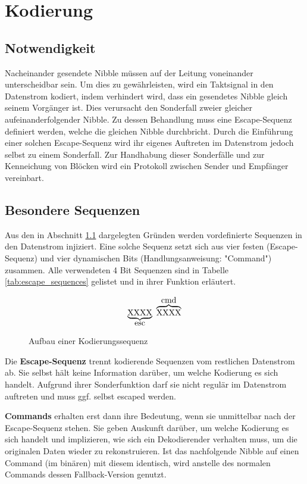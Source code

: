 \chapter{Kodierung}
\section{Notwendigkeit}
\label{sec:notwendigkeit}
Nacheinander gesendete Nibble müssen auf der Leitung voneinander unterscheidbar sein. Um dies zu gewährleisten, wird ein Taktsignal in den Datenstrom kodiert, indem verhindert wird, dass ein gesendetes Nibble gleich seinem Vorgänger ist. Dies verursacht den Sonderfall zweier gleicher aufeinanderfolgender Nibble. Zu dessen Behandlung muss eine Escape-Sequenz definiert werden, welche die gleichen Nibble durchbricht. Durch die Einführung einer solchen Escape-Sequenz wird ihr eigenes Auftreten im Datenstrom jedoch selbst zu einem Sonderfall. Zur Handhabung dieser Sonderfälle und zur Kenneichung von Blöcken wird ein Protokoll zwischen Sender und Empfänger vereinbart.

\section{Besondere Sequenzen}
Aus den in Abschnitt \ref{sec:notwendigkeit} dargelegten Gründen werden vordefinierte Sequenzen in den Datenstrom injiziert. Eine solche Sequenz setzt sich aus vier festen (Escape-Sequenz) und vier dynamischen Bits (Handlungsanweisung: "Command") zusammen. Alle verwendeten 4 Bit Sequenzen sind in Tabelle \ref{tab:escape_sequences} gelistet und in ihrer Funktion erläutert.

\begin{figure}[H]
    \centering
    \[
        \underbrace{\text{XXXX}}_\text{\normalsize esc} \ \overbrace{\text{XXXX}}^\text{\normalsize cmd}
    \]
    \caption{Aufbau einer Kodierungssequenz}
\end{figure}

Die \textbf{Escape-Sequenz} trennt kodierende Sequenzen vom restlichen Datenstrom ab. Sie selbst hält keine Information darüber, um welche Kodierung es sich handelt. Aufgrund ihrer Sonderfunktion darf sie nicht regulär im Datenstrom auftreten und muss ggf. selbst escaped werden.

\textbf{Commands} erhalten erst dann ihre Bedeutung, wenn sie unmittelbar nach der Escape-Sequenz stehen. Sie geben Auskunft darüber, um welche Kodierung es sich handelt und implizieren, wie sich ein Dekodierender verhalten muss, um die originalen Daten wieder zu rekonstruieren. Ist das nachfolgende Nibble auf einen Command (im binären) mit diesem identisch, wird anstelle des normalen Commands dessen Fallback-Version genutzt.

